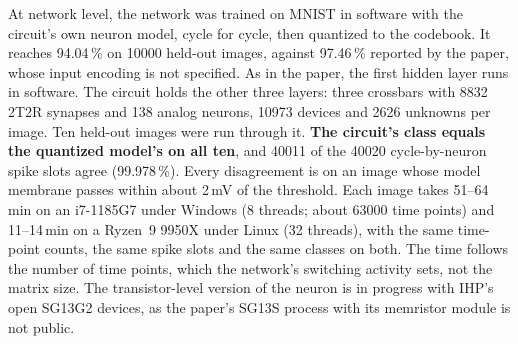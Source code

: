 At network level, the network was trained on MNIST in software with the circuit's own neuron
model, cycle for cycle, then quantized to the codebook. It reaches 94.04\,\% on \num{10000}
held-out images, against 97.46\,\% reported by the paper, whose input encoding is not specified.
As in the paper, the first hidden layer runs in software. The circuit holds the other three
layers: three crossbars with \num{8832} 2T2R synapses and 138 analog neurons, \num{10973}
devices and \num{2626} unknowns per image. Ten held-out images were run through it. \textbf{The
circuit's class equals the quantized model's on all ten}, and \num{40011} of the \num{40020}
cycle-by-neuron spike slots agree (99.978\,\%). Every disagreement is on an image whose model
membrane passes within about 2\,mV of the threshold. Each image takes 51--64\,min on an
i7-1185G7 under Windows (8 threads; about \num{63000} time points) and 11--14\,min on a
Ryzen~9 9950X under Linux (32 threads), with the same time-point counts, the same spike slots and
the same classes on both. The time follows the number of time points, which the network's
switching activity sets, not the matrix size. The transistor-level version
of the neuron is in progress with IHP's open SG13G2 devices, as the paper's SG13S process with
its memristor module is not public.
